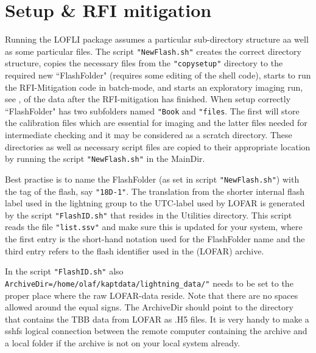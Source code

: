 \documentclass[fleqn,11pt]{book}
\begin{document}
\chapter{Setup \& RFI mitigation}

Running the LOFLI package assumes a particular sub-directory structure aa well as some particular files. The script \verb!"NewFlash.sh"! creates the correct directory structure, copies the necessary files from the \verb!"copysetup"! directory to the required new ``FlashFolder" (requires some editing of the shell code), starts to run the RFI-Mitigation code in batch-mode, and starts an exploratory imaging run, see , of the data after the RFI-mitigation has finished.
When setup correctly ``FlashFolder"  has two subfolders named \verb!"Book! and \verb!"files!. The first will store the calibration files which are essential for imaging and the latter files needed for intermediate checking and it may be considered as a scratch directory. These directories as well as necessary script files are copied to their appropriate location by running the script \verb!"NewFlash.sh"! in the MainDir.

Best practise is to name the FlashFolder (as set in script \verb!"NewFlash.sh"!) with the tag of the flash, say \verb!"18D-1"!.
The translation from the shorter internal flash label used in the lightning group to the UTC-label used by LOFAR is generated by the script \verb!"FlashID.sh"! that resides in the Utilities directory. This script reads the file \verb!"list.ssv"! and make sure this is updated for your system, where the first entry is the short-hand notation used for the FlashFolder name and the third entry refers to the flash identifier used in the (LOFAR) archive.



In the script \verb!"FlashID.sh"! also \verb!ArchiveDir=/home/olaf/kaptdata/lightning_data/"! needs to be set to the proper place where the raw LOFAR-data reside. Note that there are no spaces allowed around the equal signs. The ArchiveDir should point to the directory that contains the TBB data from LOFAR as .H5 files. It is very handy to make a sshfs logical connection between the remote computer containing the archive and a local folder if the archive is not on your local system already.
\end{document}
